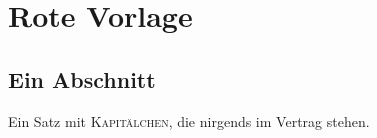 \chapter{Rote Vorlage}\label{c98}

\section{Ein Abschnitt}\label{c98.s1}

Ein Satz mit \textsc{Kapitälchen}, die nirgends im Vertrag stehen.
